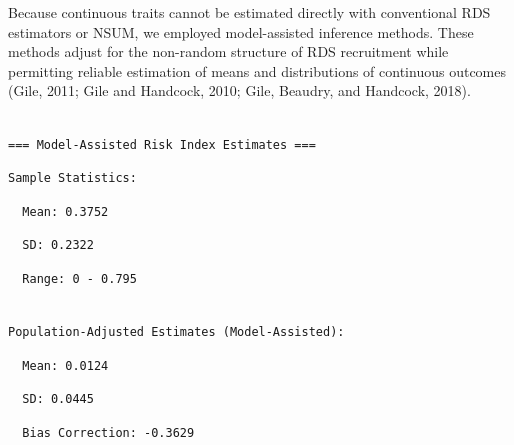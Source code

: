 \documentclass[
  12pt,
  letterpaper,
  DIV=11,
  numbers=noendperiod]{scrartcl}
\theoremstyle{plain}
\theoremstyle{definition}
\begin{document}
Because continuous traits cannot be estimated directly with conventional
RDS estimators or NSUM, we employed model-assisted inference methods.
These methods adjust for the non-random structure of RDS recruitment
while permitting reliable estimation of means and distributions of
continuous outcomes (Gile, 2011; Gile and Handcock, 2010; Gile, Beaudry,
and Handcock, 2018).

\begin{verbatim}

=== Model-Assisted Risk Index Estimates ===
\end{verbatim}

\begin{verbatim}
Sample Statistics:
\end{verbatim}

\begin{verbatim}
  Mean: 0.3752 
\end{verbatim}

\begin{verbatim}
  SD: 0.2322 
\end{verbatim}

\begin{verbatim}
  Range: 0 - 0.795 
\end{verbatim}

\begin{verbatim}

Population-Adjusted Estimates (Model-Assisted):
\end{verbatim}

\begin{verbatim}
  Mean: 0.0124 
\end{verbatim}

\begin{verbatim}
  SD: 0.0445 
\end{verbatim}

\begin{verbatim}
  Bias Correction: -0.3629 
\end{verbatim}
\end{document}
